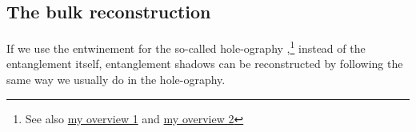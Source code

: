 \documentclass[12pt]{article}
\begin{document}
\subsection*{The bulk reconstruction}
If we use the entwinement for the so-called hole-ography \cite{Balasubramanian:2013lsa,Czech:2014ppa},\footnote{See also \href{https://albertmcc.github.io/web/overview_papers/Hole_ographic_spacetime.pdf}{\color{blue}my overview 1} and \href{https://albertmcc.github.io/web/overview_papers/Nuts_and_Bolts_for_Creating_space.pdf}{\color{blue}my overview 2}} instead of the entanglement itself, entanglement shadows can be reconstructed by following the same way we usually do in the hole-ography.







































 

\end{document}
